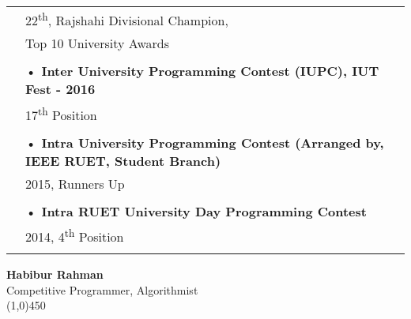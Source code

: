 \documentclass[letterpaper,11pt,oneside]{article}
\begin{document}
\begin{tabular}{@{} l l}
     & \parbox{5.0in}{22\textsuperscript{th}, Rajshahi Divisional Champion,} \\
     & \parbox{5.0in}{Top 10 University Awards}\\
     & \\
     & \textbf{• Inter University Programming Contest (IUPC), IUT Fest - 2016} \\
     & \parbox{5.0in}{17\textsuperscript{th} Position} \\
     & \\
     & \textbf{• Intra University Programming Contest (Arranged by, IEEE RUET, Student Branch)} \\
     & \parbox{5.0in}{2015, Runners Up} \\
     & \\
     & \textbf{• Intra RUET University Day Programming Contest} \\
     & \parbox{5.0in}{2014, 4\textsuperscript{th} Position} \\
     & \\
\end{tabular}
\newpage
\center  \LARGE{\textbf{Habibur Rahman}} \\ \small{Competitive Programmer, Algorithmist} \\
\vspace{-1ex}
{\line(1,0){450}}
\vspace{2em}
\noindent 
\end{document}
